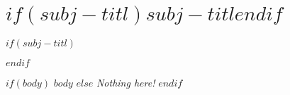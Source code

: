 \chapter*{$if(subj-titl)$\LARGE{$subj-titl$}$endif$}

$if(subj-titl)$$endif$
\setcounter{section}{0}

\def \logbuchsubjectmark {$if(subj-titl)$$subj-titl$$else$$endif$}
\def \logbuchsubjectdatemark {$if(subj-date)$$subj-date$$else$$endif$}
\def \logbuchsubjectauthmark {\textit{$for(subj-auth)$$subj-auth$$sep$, $endfor$}}
\thispagestyle{eisvogel-header-footer}
$if(body)$
$body$
$else$
\textit{Nothing here!}
$endif$
